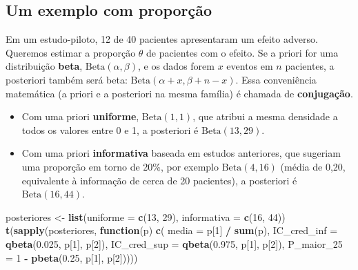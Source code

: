 \documentclass[
]{book}
\newenvironment{Shaded}{\begin{snugshade}}{\end{snugshade}}
\newcommand{\AttributeTok}[1]{\textcolor[rgb]{0.13,0.29,0.53}{#1}}
\newcommand{\ControlFlowTok}[1]{\textcolor[rgb]{0.13,0.29,0.53}{\textbf{#1}}}
\newcommand{\DecValTok}[1]{\textcolor[rgb]{0.00,0.00,0.81}{#1}}
\newcommand{\FloatTok}[1]{\textcolor[rgb]{0.00,0.00,0.81}{#1}}
\newcommand{\FunctionTok}[1]{\textcolor[rgb]{0.13,0.29,0.53}{\textbf{#1}}}
\newcommand{\NormalTok}[1]{#1}
\newcommand{\OtherTok}[1]{\textcolor[rgb]{0.56,0.35,0.01}{#1}}
\newcommand{\SpecialCharTok}[1]{\textcolor[rgb]{0.81,0.36,0.00}{\textbf{#1}}}
\providecommand{\tightlist}{%
  \setlength{\itemsep}{0pt}\setlength{\parskip}{0pt}}
\begin{document}
\subsection{Um exemplo com proporção}\label{um-exemplo-com-proporuxe7uxe3o}

Em um estudo-piloto, 12 de 40 pacientes apresentaram um efeito adverso. Queremos estimar a proporção \(\theta\) de pacientes com o efeito. Se a priori for uma distribuição \textbf{beta}, \(\text{Beta}(\alpha, \beta)\), e os dados forem \(x\) eventos em \(n\) pacientes, a posteriori também será beta: \(\text{Beta}(\alpha + x, \beta + n - x)\). Essa conveniência matemática (a priori e a posteriori na mesma família) é chamada de \textbf{conjugação}.

\begin{itemize}
\tightlist
\item
  Com uma priori \textbf{uniforme}, \(\text{Beta}(1, 1)\), que atribui a mesma densidade a todos os valores entre 0 e 1, a posteriori é \(\text{Beta}(13, 29)\).
\item
  Com uma priori \textbf{informativa} baseada em estudos anteriores, que sugeriam uma proporção em torno de 20\%, por exemplo \(\text{Beta}(4, 16)\) (média de 0,20, equivalente à informação de cerca de 20 pacientes), a posteriori é \(\text{Beta}(16, 44)\).
\end{itemize}

\begin{Shaded}
\begin{Highlighting}[]
\NormalTok{posteriores }\OtherTok{\textless{}{-}} \FunctionTok{list}\NormalTok{(}\AttributeTok{uniforme =} \FunctionTok{c}\NormalTok{(}\DecValTok{13}\NormalTok{, }\DecValTok{29}\NormalTok{), }\AttributeTok{informativa =} \FunctionTok{c}\NormalTok{(}\DecValTok{16}\NormalTok{, }\DecValTok{44}\NormalTok{))}
\FunctionTok{t}\NormalTok{(}\FunctionTok{sapply}\NormalTok{(posteriores, }\ControlFlowTok{function}\NormalTok{(p) }\FunctionTok{c}\NormalTok{(}
  \AttributeTok{media =}\NormalTok{ p[}\DecValTok{1}\NormalTok{] }\SpecialCharTok{/} \FunctionTok{sum}\NormalTok{(p),}
  \AttributeTok{IC\_cred\_inf =} \FunctionTok{qbeta}\NormalTok{(}\FloatTok{0.025}\NormalTok{, p[}\DecValTok{1}\NormalTok{], p[}\DecValTok{2}\NormalTok{]),}
  \AttributeTok{IC\_cred\_sup =} \FunctionTok{qbeta}\NormalTok{(}\FloatTok{0.975}\NormalTok{, p[}\DecValTok{1}\NormalTok{], p[}\DecValTok{2}\NormalTok{]),}
  \AttributeTok{P\_maior\_25 =} \DecValTok{1} \SpecialCharTok{{-}} \FunctionTok{pbeta}\NormalTok{(}\FloatTok{0.25}\NormalTok{, p[}\DecValTok{1}\NormalTok{], p[}\DecValTok{2}\NormalTok{]))))}
\end{Highlighting}
\end{Shaded}
\end{document}
